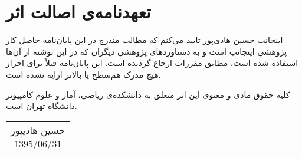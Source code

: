 \clearpage
\newpage
\baselineskip=1.5cm
\chapter*{تعهدنامه‌ی اصالت اثر}
 \thispagestyle{empty}
اینجانب حسین هادی‌پور تایید می‌کنم که مطالب مندرج در این پایان‌نامه حاصل کار پژوهشی اینجانب است و به دستاوردهای پژوهشی دیگران که در این نوشته از آن‌ها استفاده شده است، مطابق مقررات ارجاع گردیده است. این پایان‌نامه قبلاً برای احراز هیچ مدرک هم‌سطح یا بالاتر ارایه نشده است.

\noindent
کلیه حقوق مادی و معنوی این اثر متعلق به دانشکده‌ی ریاضی، آمار و علوم کامپیوتر دانشگاه تهران است. 
\vskip 0.5cm\noindent
 \begin{tabular}{c}
حسین هادیپور \\ 
$1395/06/31$ \\ 
\end{tabular} 
\baselineskip=0.75cm